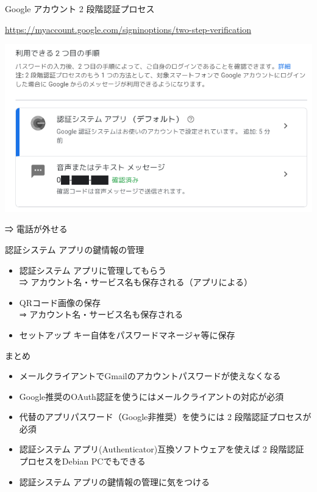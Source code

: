 \begin{frame}{Google アカウント 2 段階認証プロセス}

{\footnotesize\url{https://myaccount.google.com/signinoptions/two-step-verification}}

\begin{center}
\includegraphics[width=0.7\hsize]{image202205/g-signinopt-twostepverif-2.png}
\end{center}

\begin{quote}
\end{quote}

⇒ 電話が外せる

\end{frame}

\begin{frame}{認証システム アプリの鍵情報の管理}

\begin{itemize}
 \item 認証システム アプリに管理してもらう\\
⇒ アカウント名・サービス名も保存される（アプリによる）
 \item QRコード画像の保存\\
⇒ アカウント名・サービス名も保存される
 \item セットアップ キー自体をパスワードマネージャ等に保存
\end{itemize}

\end{frame}

\begin{frame}{まとめ}

\begin{itemize}
 \item メールクライアントでGmailのアカウントパスワードが使えなくなる
 \item Google推奨のOAuth認証を使うにはメールクライアントの対応が必須
 \item 代替のアプリパスワード（Google非推奨）を使うには 2 段階認証プロセスが必須
 \item 認証システム アプリ(Authenticator)互換ソフトウェアを使えば 2 段階認証プロセスをDebian PCでもできる
 \item 認証システム アプリの鍵情報の管理に気をつける
\end{itemize}

\end{frame}




